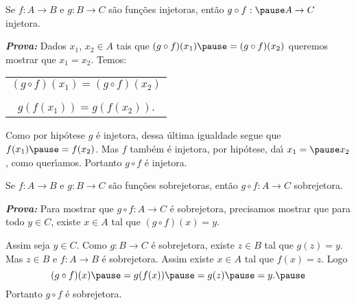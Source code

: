 \documentclass{beamer}
\begin{document}
    \begin{frame}
        \vspace{5cm}
    \end{frame}

    \begin{frame}
        \begin{proposicao}
            Se $f : A \to B$ \pause e $g : B \to C$ \pause s{\~a}o fun{\c c}{\~o}es injetoras, \pause ent{\~a}o $g\circ f : \pause A \to C$  injetora.\pause
        \end{proposicao}
            \noindent \textbf{\textit{Prova: }}\pause
            Dados $x_1$, \pause $x_2 \in A$ \pause tais que $(g\circ f)(x_1) \pause = (g\circ f)(x_2)$ \pause queremos mostrar que $x_1 = x_2$. \pause Temos:\pause
            \begin{center}
                \begin{tabular}{c}
                    $(g\circ f)(x_1) = (g\circ f)(x_2)$\pause\\
                    \\
                    $g(f(x_1)) = g(f(x_2))$.\pause
                \end{tabular}
            \end{center}
            Como por hip\'otese \pause $g$ \'e injetora, \pause dessa \'ultima igualdade segue \pause  que $f(x_1) \pause = f(x_2)$. \pause Mas $f$ tamb\'em \'e injetora, \pause por hip\'otese, \pause da{\'\i} $x_1 = \pause x_2$, como quer{\'\i}amos. \pause Portanto $g\circ f$ \'e injetora.\pause \hspace{.3cm} \qedsymbol
    \end{frame}

    \begin{frame}
        \begin{proposicao}
            Se $f : A \to B$ \pause e $g : B \to C$ \pause s{\~a}o fun\c{c}\~oes sobrejetoras, \pause ent{\~a}o $g\circ f : A \to C$  sobrejetora.\pause
        \end{proposicao}
        \noindent \textbf{\textit{Prova: }}\pause
        Para mostrar que $g \circ f : A \to C$ \pause \'e sobrejetora, \pause precisamos mostrar que para todo $y \in C$, \pause existe $x \in A$ \pause tal que $(g\circ f)(x) = y$.\pause

        Assim seja $y \in C$. \pause Como $g : B \to C$ \'e sobrejetora, \pause existe $z \in B$ \pause tal que $g(z) = y$. \pause Mas $z \in B$ \pause e $f : A \to B$ \pause \'e sobrejetora. \pause Assim existe $x \in A$ \pause tal que $f(x) = z$. \pause Logo\pause
        \[
            (g\circ f)(x) \pause = g(f(x)) \pause = g(z) \pause = y.\pause
        \]
        Portanto $g \circ f$ \pause \'e sobrejetora.\pause \hspace{.5cm} \qedsymbol
    \end{frame}
\end{document}

